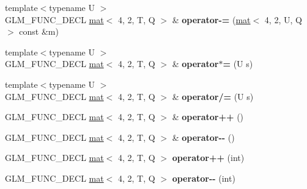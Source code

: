 \begin{DoxyCompactItemize}
{\footnotesize template$<$typename U $>$ }\\G\+L\+M\+\_\+\+F\+U\+N\+C\+\_\+\+D\+E\+CL \hyperlink{structglm_1_1mat}{mat}$<$ 4, 2, T, Q $>$ \& {\bfseries operator-\/=} (\hyperlink{structglm_1_1mat}{mat}$<$ 4, 2, U, Q $>$ const \&m)
\item 
\mbox{\label{structglm_1_1mat_3_014_00_012_00_01T_00_01Q_01_4_a4e8ca47ff05d03dd3ed84685dc401376}} 
{\footnotesize template$<$typename U $>$ }\\G\+L\+M\+\_\+\+F\+U\+N\+C\+\_\+\+D\+E\+CL \hyperlink{structglm_1_1mat}{mat}$<$ 4, 2, T, Q $>$ \& {\bfseries operator$\ast$=} (U s)
\item 
\mbox{\label{structglm_1_1mat_3_014_00_012_00_01T_00_01Q_01_4_aa1a9ec4ecebe060e0d61b07cbde4c234}} 
{\footnotesize template$<$typename U $>$ }\\G\+L\+M\+\_\+\+F\+U\+N\+C\+\_\+\+D\+E\+CL \hyperlink{structglm_1_1mat}{mat}$<$ 4, 2, T, Q $>$ \& {\bfseries operator/=} (U s)
\item 
\mbox{\label{structglm_1_1mat_3_014_00_012_00_01T_00_01Q_01_4_a973f220e1471a6dd869ce2b5eb569bfa}} 
G\+L\+M\+\_\+\+F\+U\+N\+C\+\_\+\+D\+E\+CL \hyperlink{structglm_1_1mat}{mat}$<$ 4, 2, T, Q $>$ \& {\bfseries operator++} ()
\item 
\mbox{\label{structglm_1_1mat_3_014_00_012_00_01T_00_01Q_01_4_adffff37695848dddf217654fbbd42862}} 
G\+L\+M\+\_\+\+F\+U\+N\+C\+\_\+\+D\+E\+CL \hyperlink{structglm_1_1mat}{mat}$<$ 4, 2, T, Q $>$ \& {\bfseries operator-\/-\/} ()
\item 
\mbox{\label{structglm_1_1mat_3_014_00_012_00_01T_00_01Q_01_4_ae81f2be5be6e25c0b903442b0ec65d9c}} 
G\+L\+M\+\_\+\+F\+U\+N\+C\+\_\+\+D\+E\+CL \hyperlink{structglm_1_1mat}{mat}$<$ 4, 2, T, Q $>$ {\bfseries operator++} (int)
\item 
\mbox{\label{structglm_1_1mat_3_014_00_012_00_01T_00_01Q_01_4_a3fb0499b3c4e78d4d52ad9ee06146c06}} 
G\+L\+M\+\_\+\+F\+U\+N\+C\+\_\+\+D\+E\+CL \hyperlink{structglm_1_1mat}{mat}$<$ 4, 2, T, Q $>$ {\bfseries operator-\/-\/} (int)

\end{DoxyCompactItemize}
